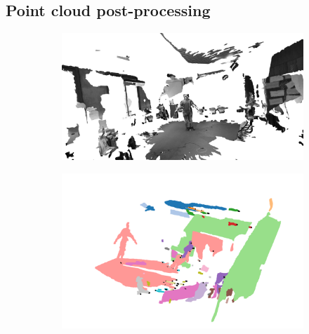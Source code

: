 \documentclass[conference]{IEEEtran}
\begin{document}
\subsection{Point cloud post-processing}
\begin{figure}[h]
    \begin{subfigure}{.24\textwidth}
    \includegraphics[width=\linewidth]{Pictures/Pointcloud_Kinects.png}
    \end{subfigure}
    \begin{subfigure}{.24\textwidth}
    \includegraphics[width=\linewidth]{Pictures/DB_Scan.png}
    \end{subfigure}
    \begin{subfigure}{.24\textwidth}

\end{subfigure}
\end{figure}
\end{document}
